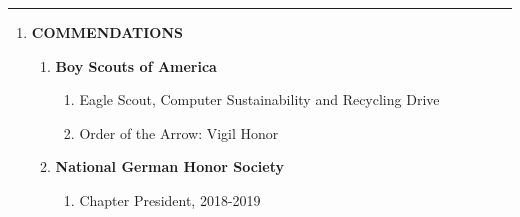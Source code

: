 \documentclass[11pt]{article}
\begin{document}
\textcolor{black!20}{\rule{\textwidth}{3pt}}
\begin{center}
\begin{enumerate}[label={}, leftmargin=0pt]
    \item {\Large \textbf{COMMENDATIONS}}
    \begin{enumerate}[label={}]
        \item \textbf{Boy Scouts of America}
        \begin{enumerate}[label={--}]
            \item Eagle Scout, Computer Sustainability and Recycling Drive
            \item Order of the Arrow: Vigil Honor
        \end{enumerate}
        \item \textbf{National German Honor Society}
        \begin{enumerate}[label={--}]
            \item Chapter President, 2018-2019
        \end{enumerate}
    \end{enumerate}
\end{enumerate}
\end{center}
\end{document}
